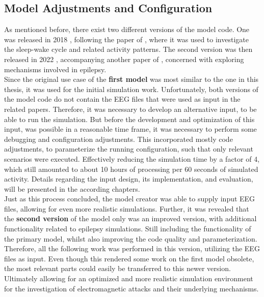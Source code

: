     \subsection{Model Adjustments and Configuration}
    As mentioned before, there exist two different versions of the model code. One was released in 2018 \cite{HippSimModel.1}, following the paper of \textcite{Aussel.2018}, where it was used to investigate the sleep-wake cycle and related activity patterns. The second version was then released in 2022 \cite{HippSimModel.2}, accompanying another paper of \textcite{Aussel.2022}, concerned with exploring mechanisms involved in epilepsy.\\
    Since the original use case of the \textbf{first model} was most similar to the one in this thesis, it was used for the initial simulation work. Unfortunately, both versions of the model code do not contain the EEG files that were used as input in the related papers. Therefore, it was necessary to develop an alternative input, to be able to run the simulation. But before the development and optimization of this input, was possible in a reasonable time frame, it was necessary to perform some debugging and configuration adjustments. This incorporated mostly code adjustments, to parameterize the running configuration, such that only relevant scenarios were executed. Effectively reducing the simulation time by a factor of 4, which still amounted to about 10 hours of processing per 60 seconds of simulated activity. Details regarding the input design, its implementation, and evaluation, will be presented in the according chapters.\\
    Just as this process concluded, the model creator was able to supply input EEG files, allowing for even more realistic simulations. Further, it was revealed that the \textbf{second version} of the model only was an improved version, with additional functionality related to epilepsy simulations. Still including the functionality of the primary model, whilst also improving the code quality and parameterization. Therefore, all the following work was performed in this version, utilizing the EEG files as input. Even though this rendered some work on the first model obsolete, the most relevant parts could easily be transferred to this newer version. Ultimately allowing for an optimized and more realistic simulation environment for the investigation of electromagnetic attacks and their underlying mechanisms. 

